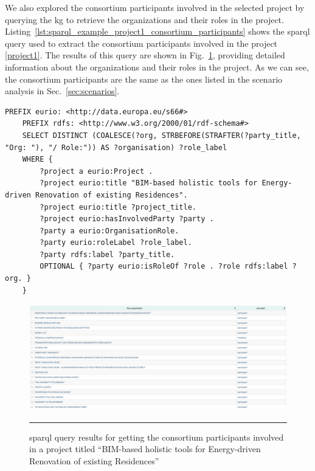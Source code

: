 We also explored the consortium participants involved in the selected project by querying the \gls{kg} to retrieve the organizations and their roles in the project.
Listing~\ref{lst:sparql_example_project1_consortium_participants} shows the \gls{sparql} query used to extract the consortium participants involved in the project \ref{project1}.
The results of this query are shown in Fig.~\ref{fig:sparql_example_project1_consortium_participants}, providing detailed information about the organizations and their roles in the project.
As we can see, the consortium participants are the same as the ones listed in the scenario analysis in Sec.~\ref{sec:scenarios}.

\begin{lstlisting}[language=SPARQL, caption={\gls{sparql} query for getting the consortium participants involved in a project titled ``BIM-based holistic tools for Energy-driven Renovation of existing Residences''}, label=lst:sparql_example_project1_consortium_participants]
    PREFIX eurio: <http://data.europa.eu/s66#>
    PREFIX rdfs: <http://www.w3.org/2000/01/rdf-schema#>
    SELECT DISTINCT (COALESCE(?org, STRBEFORE(STRAFTER(?party_title, "Org: "), "/ Role:")) AS ?organisation) ?role_label
    WHERE {
        ?project a eurio:Project .
        ?project eurio:title "BIM-based holistic tools for Energy-driven Renovation of existing Residences".
        ?project eurio:title ?project_title.
        ?project eurio:hasInvolvedParty ?party .
        ?party a eurio:OrganisationRole.
        ?party eurio:roleLabel ?role_label.
        ?party rdfs:label ?party_title.
        OPTIONAL { ?party eurio:isRoleOf ?role . ?role rdfs:label ?org. }
    }
\end{lstlisting}

\begin{figure}[htbp]
    \centering
 \includegraphics[width=.8\textwidth]{figures/architecture/sparql_example_project1_consortium_participants.png}
     \rule{35em}{0.5pt}
    \caption{\gls{sparql} query results for getting the consortium participants involved in a project titled ``BIM-based holistic tools for Energy-driven Renovation of existing Residences''}
 \label{fig:sparql_example_project1_consortium_participants}
\end{figure}

